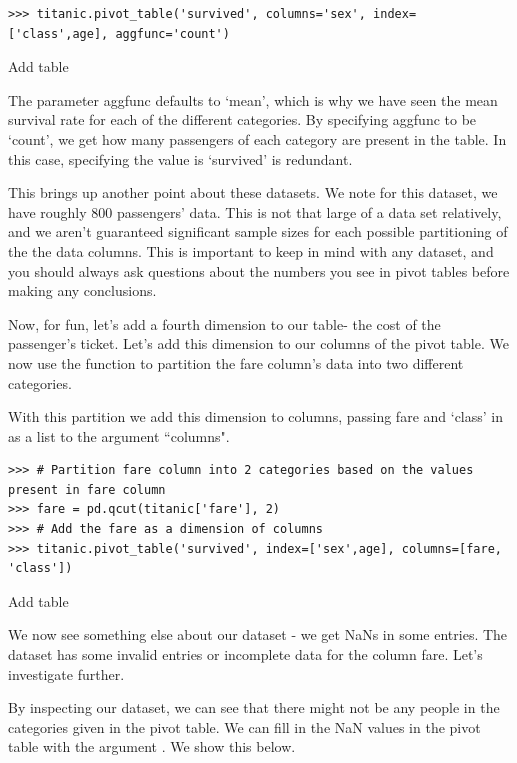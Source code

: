 \begin{lstlisting}
>>> titanic.pivot_table('survived', columns='sex', index=['class',age], aggfunc='count')
\end{lstlisting}

Add table

The parameter aggfunc defaults to `mean', which is why we have seen the mean survival rate for each of the different categories. By specifying aggfunc to be `count', we get how many passengers of each category are present in the table. In this case, specifying the value is `survived' is redundant.

This brings up another point about these datasets. We note for this dataset, we have roughly 800 passengers' data. This is not that large of a data set relatively, and we aren't guaranteed significant sample sizes for each possible partitioning of the the data columns. This is important to keep in mind with any dataset, and you should always ask questions about the numbers you see in pivot tables before making any conclusions.

Now, for fun, let's add a fourth dimension to our table- the cost of the passenger's ticket. Let's add this dimension to our columns of the pivot table. We now use the function  to partition the fare column's data into two different categories.

With this partition we add this dimension to columns, passing fare and `class' in as a list to the argument ``columns".

\begin{lstlisting}
>>> # Partition fare column into 2 categories based on the values present in fare column
>>> fare = pd.qcut(titanic['fare'], 2)
>>> # Add the fare as a dimension of columns
>>> titanic.pivot_table('survived', index=['sex',age], columns=[fare, 'class'])
\end{lstlisting}

Add table

We now see something else about our dataset - we get NaNs in some entries. The dataset has some invalid entries or incomplete data for the column fare. Let's investigate further.

By inspecting our dataset, we can see that there might not be any people in the categories given in the pivot table. We can fill in the NaN values in the pivot table with the argument . We show this below.

